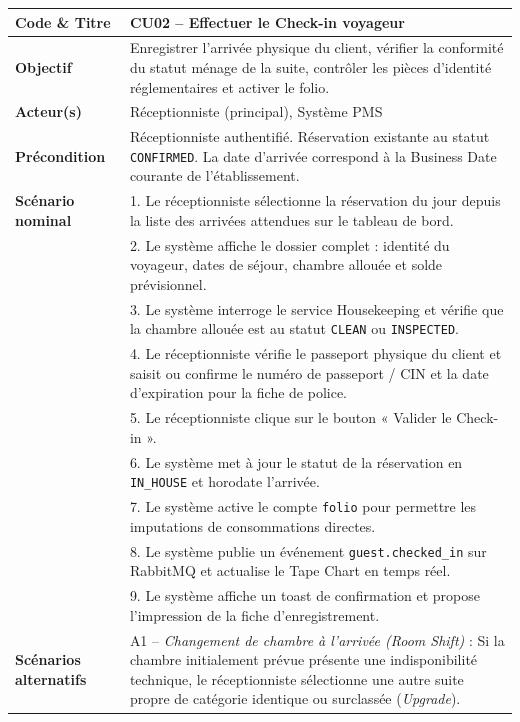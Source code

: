 \begin{table}[H]
\centering
\small
\renewcommand{\arraystretch}{1.2}
\begin{tabularx}{\textwidth}{|p{3.5cm}|X|}
\hline
\textbf{Code \& Titre} & \textbf{CU02 -- Effectuer le Check-in voyageur} \\
\hline
\textbf{Objectif} & Enregistrer l'arrivée physique du client, vérifier la conformité du statut ménage de la suite, contrôler les pièces d'identité réglementaires et activer le folio. \\
\hline
\textbf{Acteur(s)} & Réceptionniste (principal), Système PMS \\
\hline
\textbf{Précondition} & Réceptionniste authentifié. Réservation existante au statut \texttt{CONFIRMED}. La date d'arrivée correspond à la Business Date courante de l'établissement. \\
\hline
\textbf{Scénario nominal} & 
1. Le réceptionniste sélectionne la réservation du jour depuis la liste des arrivées attendues sur le tableau de bord.\\
& 2. Le système affiche le dossier complet : identité du voyageur, dates de séjour, chambre allouée et solde prévisionnel.\\
& 3. Le système interroge le service Housekeeping et vérifie que la chambre allouée est au statut \texttt{CLEAN} ou \texttt{INSPECTED}.\\
& 4. Le réceptionniste vérifie le passeport physique du client et saisit ou confirme le numéro de passeport / CIN et la date d'expiration pour la fiche de police.\\
& 5. Le réceptionniste clique sur le bouton « Valider le Check-in ».\\
& 6. Le système met à jour le statut de la réservation en \texttt{IN\_HOUSE} et horodate l'arrivée.\\
& 7. Le système active le compte \texttt{folio} pour permettre les imputations de consommations directes.\\
& 8. Le système publie un événement \texttt{guest.checked\_in} sur RabbitMQ et actualise le Tape Chart en temps réel.\\
& 9. Le système affiche un toast de confirmation et propose l'impression de la fiche d'enregistrement.\\
\hline
\textbf{Scénarios alternatifs} & 
A1 -- \textit{Changement de chambre à l'arrivée (Room Shift)} : Si la chambre initialement prévue présente une indisponibilité technique, le réceptionniste sélectionne une autre suite propre de catégorie identique ou surclassée (\textit{Upgrade}).\\

\end{tabularx}
\end{table}
